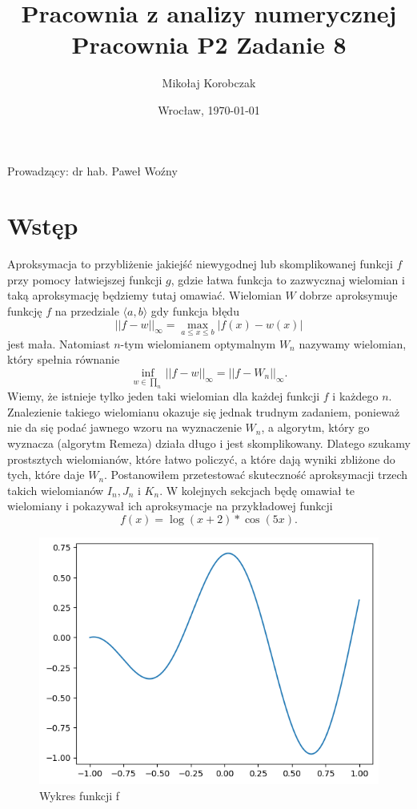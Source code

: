 \documentclass[11pt,wide]{mwart}
\date{Wrocław, \today}
\title{\LARGE\textbf{Pracownia z analizy numerycznej}\\Pracownia P2 Zadanie 8}
\author{Mikołaj Korobczak}
\begin{document}
\maketitle
\begin{center}
Prowadzący: dr hab. Paweł Woźny
\end{center}
\thispagestyle{empty}
\tableofcontents

\section{Wstęp}
Aproksymacja to przybliżenie jakiejść niewygodnej lub skomplikowanej funkcji $f$ przy pomocy łatwiejszej funkcji $g$, gdzie łatwa funkcja to zazwycznaj wielomian i taką aproksymację będziemy tutaj omawiać. Wielomian $W$ dobrze aproksymuje funkcję $f$ na przedziale $\langle a, b \rangle$ gdy funkcja błędu 
\begin{equation}
||f - w||_{\infty} = \max_{a \leq x \leq b} |f(x) - w(x)|
\end{equation}
jest mała. Natomiast $n$-tym wielomianem optymalnym $W_n$ nazywamy wielomian, który spełnia równanie
\begin{equation}
\inf_{w \in \prod_n} ||f - w||_{\infty} = ||f - W_n||_{\infty}.
\end{equation}
Wiemy, że istnieje tylko jeden taki wielomian dla każdej funkcji $f$ i każdego $n$.\cite{w1} Znalezienie takiego wielomianu okazuje się jednak trudnym zadaniem, ponieważ nie da się podać jawnego wzoru na wyznaczenie $W_n$, a algorytm, który go wyznacza (algorytm Remeza) działa długo i jest skomplikowany. Dlatego szukamy prostsztych wielomianów, które łatwo policzyć, a które dają wyniki zbliżone do tych, które daje $W_n$. Postanowiłem przetestować skuteczność aproksymacji trzech takich wielomianów $I_n, J_n$ i $K_n$. W kolejnych sekcjach będę omawiał te wielomiany i pokazywał ich aproksymacje na przykładowej funkcji
\begin{equation} \label{przykladowa}
f(x) = \log(x+2) * \cos(5x).
\end{equation}
\begin{figure}[H]
	\begin{center}
	\includegraphics[scale=0.7]{przyklad_f}
	\end{center}
	\caption{Wykres funkcji f}
\end{figure}
\end{document}
